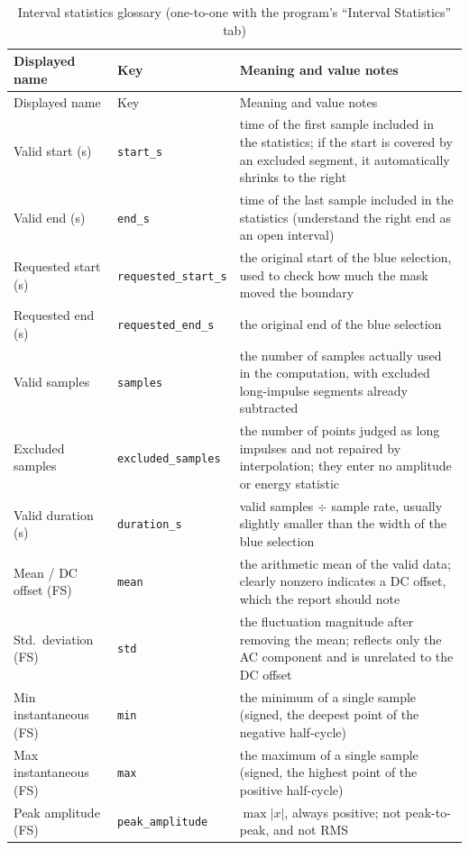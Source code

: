 \documentclass[UTF8,a4paper,12pt]{ctexart}
\begin{document}
{\small
\begin{longtable}{@{}p{}p{}p{}@{}}
\caption{Interval statistics glossary (one-to-one with the program's ``Interval Statistics'' tab)}\\
\toprule
Displayed name & Key & Meaning and value notes \\
\midrule
\endfirsthead
\toprule
Displayed name & Key & Meaning and value notes \\
\midrule
\endhead
\bottomrule
\endfoot
Valid start (s) & \texttt{start\_s} & time of the first sample included in the statistics; if the start is covered by an excluded segment, it automatically shrinks to the right \\
Valid end (s) & \texttt{end\_s} & time of the last sample included in the statistics (understand the right end as an open interval) \\
Requested start (s) & \texttt{requested\_start\_s} & the original start of the blue selection, used to check how much the mask moved the boundary \\
Requested end (s) & \texttt{requested\_end\_s} & the original end of the blue selection \\
Valid samples & \texttt{samples} & the number of samples actually used in the computation, with excluded long-impulse segments already subtracted \\
Excluded samples & \texttt{excluded\_samples} & the number of points judged as long impulses and not repaired by interpolation; they enter no amplitude or energy statistic \\
Valid duration (s) & \texttt{duration\_s} & valid samples $\div$ sample rate, usually slightly smaller than the width of the blue selection \\
Mean / DC offset (FS) & \texttt{mean} & the arithmetic mean of the valid data; clearly nonzero indicates a DC offset, which the report should note \\
Std.\ deviation (FS) & \texttt{std} & the fluctuation magnitude after removing the mean; reflects only the AC component and is unrelated to the DC offset \\
Min instantaneous (FS) & \texttt{min} & the minimum of a single sample (signed, the deepest point of the negative half-cycle) \\
Max instantaneous (FS) & \texttt{max} & the maximum of a single sample (signed, the highest point of the positive half-cycle) \\
Peak amplitude (FS) & \texttt{peak\_amplitude} & $\max|x|$, always positive; not peak-to-peak, and not RMS \\

\end{longtable}}
\end{document}
